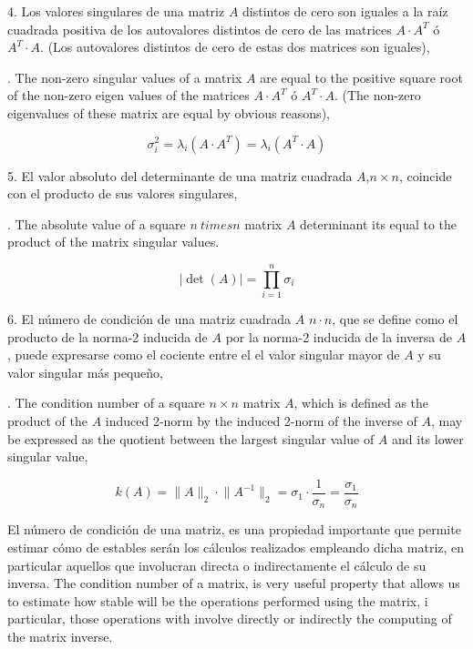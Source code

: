\begin{paracol}{2}
4. Los valores singulares de una matriz $A$ distintos de cero son iguales a la raíz cuadrada positiva de los autovalores distintos de cero de las matrices $A\cdot A^T$ ó $A^T\cdot A$. (Los autovalores distintos de cero de estas dos matrices son iguales),

. The non-zero singular values of a matrix $A$ are equal to the positive square root of the non-zero eigen values of the matrices $A\cdot A^T$ ó $A^T\cdot A$. (The non-zero eigenvalues of these matrix are equal by obvious reasons),
\end{paracol}
\begin{equation*}
\sigma_i^2=\lambda_i(A\cdot A^T)=\lambda_i(A^T\cdot A)
\end{equation*}
\begin{paracol}{2}
5. El valor absoluto del determinante de una matriz cuadrada $A$,$n\times n$, coincide con el producto de sus valores singulares,

. The absolute value of a square $n\ times n$ matrix $A$ determinant its equal to the product of the matrix singular values. 
\end{paracol}
\begin{equation*}
\vert \det(A) \vert = \prod_{i=1}^n \sigma_i
\end{equation*}
\begin{paracol}{2}
6. El número de condición de una matriz cuadrada $A$ $n\cdot n$, que se define como el producto de la norma-2 inducida de $A$ por la norma-2 inducida de la inversa de $A$, puede expresarse como el cociente entre el el valor singular mayor de $A$ y su valor singular más pequeño,

. The condition number of a square $n\times n$ matrix $A$, which is defined as the product of the $A$ induced 2-norm by the induced 2-norm of the inverse of $A$, may be expressed as the quotient between the largest singular value of $A$ and its lower singular value,
\end{paracol}
\begin{equation*}
k(A)=\lVert A \rVert_2 \cdot \lVert A^{-1} \rVert_2 = \sigma_1 \cdot \frac{1}{\sigma_n}=\frac{\sigma_1}{\sigma_n}
\end{equation*}
\begin{paracol}{2}
El número de condición de una matriz, es una propiedad importante que permite estimar cómo de estables serán los cálculos realizados empleando dicha matriz, en particular aquellos que involucran directa o indirectamente el cálculo de su inversa.
\switchcolumn
The condition number of a matrix, is very useful property that allows us to estimate how stable will be the operations performed using the matrix, i particular, those  operations with involve directly or indirectly the computing of the matrix inverse.
\end{paracol}

